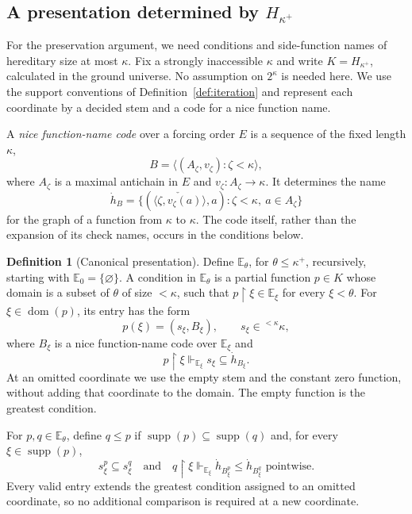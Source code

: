 \documentclass[11pt,a4paper]{amsart}
\theoremstyle{definition}
\newtheorem{definition}[theorem]{Definition}
\theoremstyle{remark}
\newcommand{\EE}{\mathbb E}
\DeclareMathOperator{\dom}{dom}
\DeclareMathOperator{\supp}{supp}
\begin{document}
\subsection{A presentation determined by
  \texorpdfstring{\(H_{\kappa^+}\)}{H-kappa-plus}}
\label{subsec:canonical}

For the preservation argument, we need conditions and
side-function names of hereditary size at most \(\kappa\).
Fix a strongly inaccessible \(\kappa\) and write
\(K=H_{\kappa^+}\), calculated in the ground universe.
No assumption on \(2^\kappa\) is needed here.
We use the support conventions of Definition~\ref{def:iteration}
and represent each coordinate by a decided stem and a code
for a nice function name.

A \emph{nice function-name code} over a forcing order \(E\)
is a sequence of the fixed length \(\kappa\),
\[
 B=\langle(A_\zeta,v_\zeta):\zeta<\kappa\rangle,
\]
where \(A_\zeta\) is a maximal antichain in \(E\) and
\(v_\zeta:A_\zeta\to\kappa\). It determines the name
\[
 \dot h_B=
 \{(\check{\langle\zeta,v_\zeta(a)\rangle},a):
                   \zeta<\kappa,\ a\in A_\zeta\}
\]
for the graph of a function from \(\kappa\) to \(\kappa\).
The code itself, rather than the expansion of its check
names, occurs in the conditions below.

\begin{definition}[Canonical presentation]\label{def:canonical}
Define \(\EE_\theta\), for \(\theta\leq\kappa^+\),
recursively, starting with \(\EE_0=\{\varnothing\}\).
A condition in \(\EE_\theta\) is a partial function
\(p\in K\) whose domain is a subset of \(\theta\)
of size \(<\kappa\), such that
\(p\restriction\xi\in\EE_\xi\) for every \(\xi<\theta\).
For \(\xi\in\dom(p)\), its entry has the form
\[
 p(\xi)=(s_\xi,B_\xi),
 \qquad s_\xi\in{}^{<\kappa}\kappa,
\]
where \(B_\xi\) is a nice function-name code over
\(\EE_\xi\) and
\[
 p\restriction\xi\Vdash_{\EE_\xi}
                         s_\xi\subseteq\dot h_{B_\xi}.
\]
At an omitted coordinate we use the empty stem and the
constant zero function, without adding that coordinate to
the domain. The empty function is the greatest condition.

For \(p,q\in\EE_\theta\), define \(q\leq p\) if
\(\supp(p)\subseteq\supp(q)\) and, for every
\(\xi\in\supp(p)\),
\[
 s_\xi^p\subseteq s_\xi^q
 \quad\text{and}\quad
 q\restriction\xi\Vdash_{\EE_\xi}
             \dot h_{B_\xi^p}\leq\dot h_{B_\xi^q}
                         \text{ pointwise}.
\]
Every valid entry extends the greatest condition assigned to
an omitted coordinate, so no additional comparison is required
at a new coordinate.
\end{definition}
\end{document}

